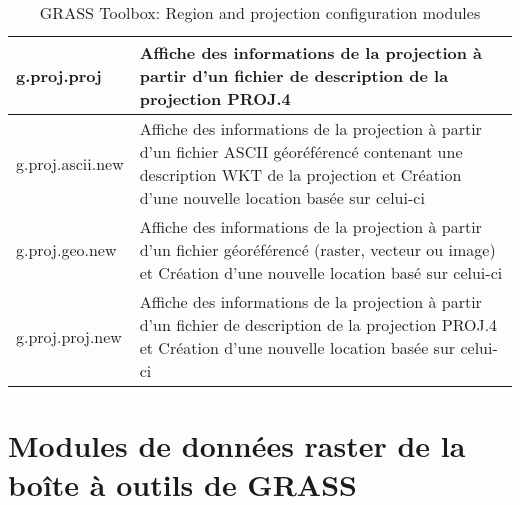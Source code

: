 \begin{table}[H]
\begin{tabular}{|p{4cm}|p{10cm}|}
  \hline g.proj.proj & Affiche des informations de la projection à partir d'un fichier de description de la projection PROJ.4 \\
  \hline g.proj.ascii.new & Affiche des informations de la projection à partir d'un fichier ASCII géoréférencé contenant une description WKT de la projection et Création d'une nouvelle location basée sur celui-ci \\
  \hline g.proj.geo.new &  Affiche des informations de la projection à partir d'un fichier géoréférencé (raster, vecteur ou image) et Création d'une nouvelle location basé sur celui-ci \\
  \hline g.proj.proj.new & Affiche des informations de la projection à partir d'un fichier de description de la projection PROJ.4 et Création d'une nouvelle location basée sur celui-ci \\
\hline
\end{tabular}
\caption{GRASS Toolbox: Region and projection configuration modules}
\end{table}

\section{Modules de données raster de la boîte à outils de GRASS}

